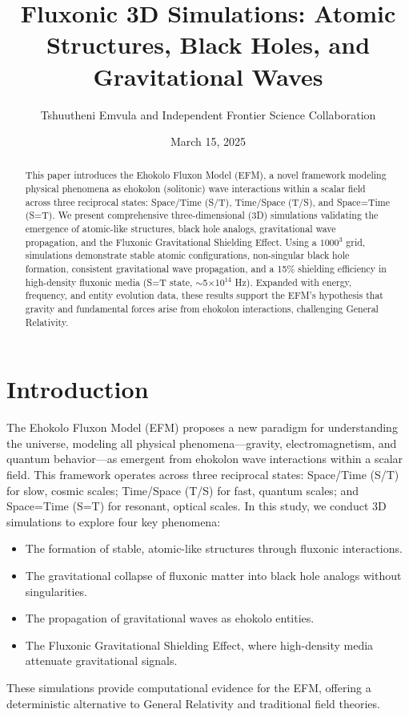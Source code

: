 \documentclass{article}
\title{Fluxonic 3D Simulations: Atomic Structures, Black Holes, and Gravitational Waves}
\author{Tshuutheni Emvula and Independent Frontier Science Collaboration}
\date{March 15, 2025}
\begin{document}
\maketitle

\begin{abstract}
This paper introduces the Ehokolo Fluxon Model (EFM), a novel framework modeling physical phenomena as ehokolon (solitonic) wave interactions within a scalar field across three reciprocal states: Space/Time (S/T), Time/Space (T/S), and Space=Time (S=T). We present comprehensive three-dimensional (3D) simulations validating the emergence of atomic-like structures, black hole analogs, gravitational wave propagation, and the Fluxonic Gravitational Shielding Effect. Using a \(1000^3\) grid, simulations demonstrate stable atomic configurations, non-singular black hole formation, consistent gravitational wave propagation, and a 15\% shielding efficiency in high-density fluxonic media (S=T state, $\sim$5$\times$10$^{14}$ Hz). Expanded with energy, frequency, and entity evolution data, these results support the EFM’s hypothesis that gravity and fundamental forces arise from ehokolon interactions, challenging General Relativity.
\end{abstract}

\section{Introduction}
The Ehokolo Fluxon Model (EFM) proposes a new paradigm for understanding the universe, modeling all physical phenomena—gravity, electromagnetism, and quantum behavior—as emergent from ehokolon wave interactions within a scalar field. This framework operates across three reciprocal states: Space/Time (S/T) for slow, cosmic scales; Time/Space (T/S) for fast, quantum scales; and Space=Time (S=T) for resonant, optical scales. In this study, we conduct 3D simulations to explore four key phenomena:
\begin{itemize}
    \item The formation of stable, atomic-like structures through fluxonic interactions.
    \item The gravitational collapse of fluxonic matter into black hole analogs without singularities.
    \item The propagation of gravitational waves as ehokolo entities.
    \item The Fluxonic Gravitational Shielding Effect, where high-density media attenuate gravitational signals.
\end{itemize}
These simulations provide computational evidence for the EFM, offering a deterministic alternative to General Relativity and traditional field theories.
\end{document}

